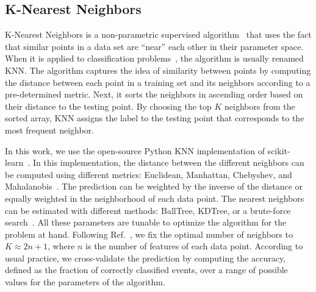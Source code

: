\subsection*{K-Nearest Neighbors}

K-Nearest Neighbors is a non-parametric supervised algorithm~\cite{Fix:1951,Cover:1967} that uses the fact that similar points in a data set are ``near'' each other in their
parameter space. When it is applied to classification problems~\cite{Guo:2004}, the algorithm is usually renamed \ac{KNN}. The algorithm captures the idea of similarity between
points by computing the distance between each point in a training set and its neighbors according to a pre-determined metric. Next, it sorts the neighbors in ascending order based on
their distance to the testing point. By choosing the top $K$ neighbors from the sorted array, \ac{KNN} assigns the label to the testing point that corresponds to the most
frequent neighbor.

In this work, we use the open-source Python \ac{KNN} implementation of scikit-learn~\cite{Pedregosa:2011}. In this implementation, the distance between the different neighbors can be
computed using different metrics: Euclidean, Manhattan, Chebyshev, and Mahalanobis~\cite{ADictionaryofStatistics}. The prediction can be weighted by the inverse of the distance or equally
weighted in the neighborhood of each data point. The nearest neighbors can be estimated with different methods: BallTree, KDTree, or a brute-force search~\cite{Bentley1975,Omohundro1989}. All these parameters are tunable to optimize the algorithm for the problem at hand. Following Ref.~\cite{Chatterjee:2019avs}, we fix the optimal number of neighbors to $K \approx 2n+1$,
where $n$ is the number of features of each data point. According to usual practice, we cross-validate the prediction by computing the accuracy, defined as the fraction of correctly classified events, over a range of possible values for the parameters of the algorithm.
